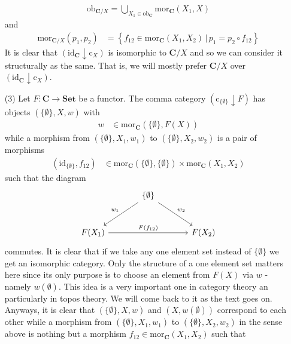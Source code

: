 \begin{enumerate}
\begin{align*}
  \mathrm{ob}_{\mathbf{C} \slash X}
  =
  \bigcup_{X_{1} \in \mathrm{ob}_{\mathbf{C}}}
  \mathrm{mor}_{\mathbf{C}}(X_{1},X)
\end{align*}
and
\begin{align*}
  \mathrm{mor}_{\mathbf{C} \slash X}(p_{1},p_{2})
  &=
  \left\lbrace
      f_{12}
      \in
      \mathrm{mor}_{\mathbf{C}}(X_{1},X_{2})
    \,
    \vert
    \,
      p_{1}
      =
      p_{2}
      \circ
      f_{12}
  \right\rbrace
\end{align*}
It is clear that $(\mathrm{id}_{\mathbf{C}} \downarrow \mathrm{c}_{X})$ is isomorphic to $\mathbf{C} \slash X$ and so we can consider it structurally as the same. That is, we will mostly prefer $\mathbf{C} \slash X$ over $(\mathrm{id}_{\mathbf{C}} \downarrow \mathrm{c}_{X})$.
\item[(3)]
Let $F \colon \mathbf{C} \rightarrow \mathbf{Set}$ be a functor. The comma category $(\mathrm{c}_{\lbrace \emptyset \rbrace} \downarrow F)$ has objects $(\lbrace \emptyset \rbrace,X,w)$ with
\begin{align*}
  w
  &\in
  \mathrm{mor}_{\mathbf{C}}(\lbrace \emptyset \rbrace,F(X))
\end{align*}
while a morphism from $(\lbrace \emptyset \rbrace,X_{1},w_{1})$ to $(\lbrace \emptyset \rbrace,X_{2},w_{2})$ is a pair of morphisms
\begin{align*}
  (\mathrm{id}_{\lbrace \emptyset \rbrace},f_{12})
  &\in
  \mathrm{mor}_{\mathbf{C}}(\lbrace \emptyset \rbrace,\lbrace \emptyset \rbrace)
  \times
  \mathrm{mor}_{\mathbf{C}}(X_{1},X_{2})
\end{align*}
such that the diagram
\[
\begin{tikzcd}[sep=large]
  &
  \lbrace
    \emptyset
  \rbrace
  \arrow[swap]{dl}{w_{1}}
  \arrow{dr}{w_{2}}
  &
  \\
  F(X_{1})
  \arrow{rr}{F(f_{12})}
  &
  &
  F(X_{2})
\end{tikzcd}
\]
commutes. It is clear that if we take any one element set instead of $\lbrace \emptyset \rbrace$ we get an isomorphic category. Only the structure of a one element set matters here since its only purpose is to choose an element from $F(X)$ via $w$ - namely $w(\emptyset)$. This idea is a very important one in category theory an particularly in topos theory. We will come back to it as the text goes on. Anyways, it is clear that $(\lbrace \emptyset \rbrace,X,w)$ and $(X,w(\emptyset))$ correspond to each other while a morphism from $(\lbrace \emptyset \rbrace,X_{1},w_{1})$ to $(\lbrace \emptyset \rbrace,X_{2},w_{2})$ in the sense above is nothing but a morphism $f_{12} \in \mathrm{mor}_{\mathbf{C}}(X_{1},X_{2})$ such that

\end{enumerate}
